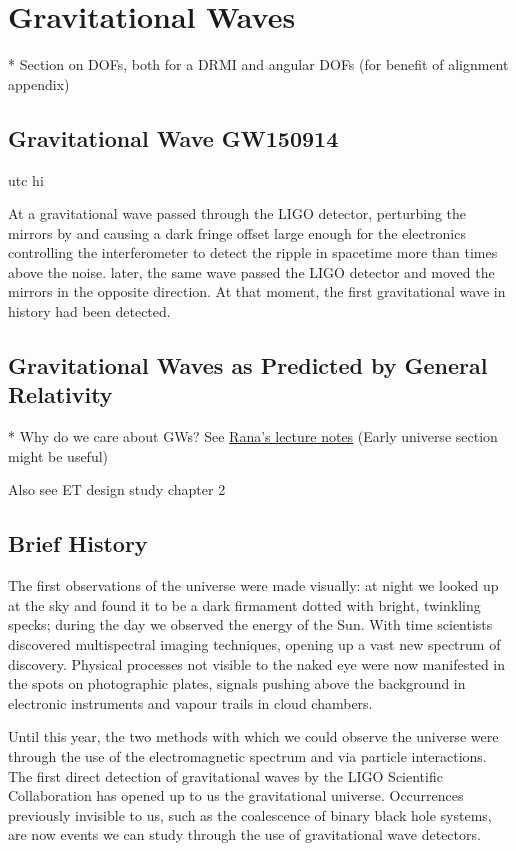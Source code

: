 \chapter{Gravitational Waves}
\label{c:gw-detection}

* Section on DOFs, both for a DRMI and angular DOFs (for benefit of alignment appendix)

\section{Gravitational Wave GW150914}
\gls{utc} hi

At  a gravitational wave passed through the LIGO  detector, perturbing the mirrors by  and causing a dark fringe offset large enough for the electronics controlling the interferometer to detect the ripple in spacetime more than  times above the noise.  later, the same wave passed the LIGO  detector and moved the mirrors in the opposite direction. At that moment, the first gravitational wave in history had been detected.

\section{Gravitational Waves as Predicted by General Relativity}
* Why do we care about GWs? See \href{https://github.com/rxa254/StatisticalPhysics/blob/master/LectureNotes/ph2c_2015.pdf}{Rana's lecture notes}  (Early universe section might be useful)

Also see ET design study chapter 2

\section{Brief History}
The first observations of the universe were made visually: at night we looked up at the sky and found it to be a dark firmament dotted with bright, twinkling specks; during the day we observed the energy of the Sun. With time scientists discovered multispectral imaging techniques, opening up a vast new spectrum of discovery. Physical processes not visible to the naked eye were now manifested in the spots on photographic plates, signals pushing above the background in electronic instruments and vapour trails in cloud chambers.

Until this year, the two methods with which we could observe the universe were through the use of the electromagnetic spectrum and via particle interactions. The first direct detection of gravitational waves by the LIGO Scientific Collaboration has opened up to us the gravitational universe. Occurrences previously invisible to us, such as the coalescence of binary black hole systems, are now events we can study through the use of gravitational wave detectors.

